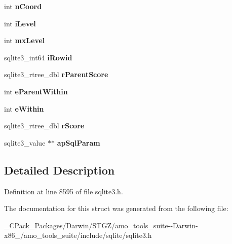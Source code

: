 \begin{DoxyCompactItemize}
int {\bfseries n\+Coord}
\item 
\mbox{\label{structsqlite3__rtree__query__info_af91ca2d5f867b3b0aa9c91920a3b5b45}} 
int {\bfseries i\+Level}
\item 
\mbox{\label{structsqlite3__rtree__query__info_ac84533734fb4c86c3f2deba904118785}} 
int {\bfseries mx\+Level}
\item 
\mbox{\label{structsqlite3__rtree__query__info_a9e43489993c8aeace851f86eaa00ec26}} 
sqlite3\+\_\+int64 {\bfseries i\+Rowid}
\item 
\mbox{\label{structsqlite3__rtree__query__info_af7da93e7fc405eec7e7ec90ab237eab2}} 
sqlite3\+\_\+rtree\+\_\+dbl {\bfseries r\+Parent\+Score}
\item 
\mbox{\label{structsqlite3__rtree__query__info_a8bd37c6af5427c35830f674a4db682c3}} 
int {\bfseries e\+Parent\+Within}
\item 
\mbox{\label{structsqlite3__rtree__query__info_ad1038309f7ea55472a7ff99bf4f9d514}} 
int {\bfseries e\+Within}
\item 
\mbox{\label{structsqlite3__rtree__query__info_af449e4a3607573d17b3d31c67b6e1584}} 
sqlite3\+\_\+rtree\+\_\+dbl {\bfseries r\+Score}
\item 
\mbox{\label{structsqlite3__rtree__query__info_a91c604c985d05e67f08b7370d7bf92aa}} 
sqlite3\+\_\+value $\ast$$\ast$ {\bfseries ap\+Sql\+Param}
\end{DoxyCompactItemize}


\subsection{Detailed Description}


Definition at line 8595 of file sqlite3.\+h.



The documentation for this struct was generated from the following file\+:\begin{DoxyCompactItemize}
\item 
\+\_\+\+C\+Pack\+\_\+\+Packages/\+Darwin/\+S\+T\+G\+Z/amo\+\_\+tools\+\_\+suite-\/-\/\+Darwin-\/x86\+\_/amo\+\_\+tools\+\_\+suite/include/sqlite/sqlite3.\+h\end{DoxyCompactItemize}
